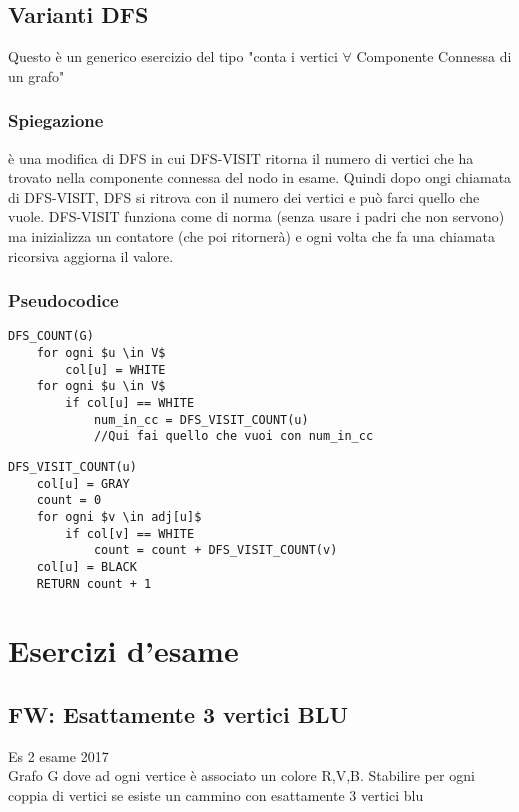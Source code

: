 \documentclass[12pt, a4paper, openany]{book}
\begin{document}
\section{Varianti DFS}
Questo è un generico esercizio del tipo "conta i vertici $\forall$ Componente Connessa di un grafo"

\subsection*{Spiegazione}
è una modifica di DFS in cui DFS-VISIT ritorna il numero di vertici che ha trovato nella componente connessa
del nodo in esame. Quindi dopo ongi chiamata di DFS-VISIT, DFS si ritrova con il numero dei vertici e può farci quello che vuole.
DFS-VISIT funziona come di norma (senza usare i padri che non servono) ma inizializza un contatore (che poi ritornerà) e ogni volta
che fa una chiamata ricorsiva aggiorna il valore.

\subsection*{Pseudocodice}

\begin{lstlisting}[mathescape=true]
DFS_COUNT(G)
    for ogni $u \in V$
        col[u] = WHITE
    for ogni $u \in V$
        if col[u] == WHITE
            num_in_cc = DFS_VISIT_COUNT(u)
            //Qui fai quello che vuoi con num_in_cc 
\end{lstlisting}

\begin{lstlisting}[mathescape=true]
DFS_VISIT_COUNT(u)
    col[u] = GRAY
    count = 0
    for ogni $v \in adj[u]$
        if col[v] == WHITE
            count = count + DFS_VISIT_COUNT(v)
    col[u] = BLACK
    RETURN count + 1
\end{lstlisting}

\chapter{Esercizi d'esame}

\section{FW: Esattamente 3 vertici BLU} Es 2 esame 2017\\
Grafo G dove ad ogni vertice è associato un colore {R,V,B}. Stabilire per ogni coppia di vertici se esiste un cammino con esattamente 3 vertici blu
\end{document}
